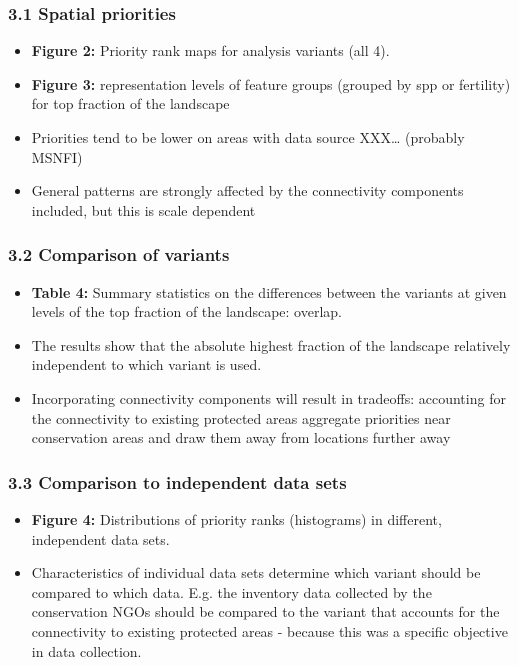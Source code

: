 \documentclass[]{article}
\begin{document}
\subsubsection{3.1 Spatial priorities}

\begin{itemize}
\item
  \textbf{Figure 2:} Priority rank maps for analysis variants (all 4).
\item
  \textbf{Figure 3:} representation levels of feature groups (grouped by
  spp or fertility) for top fraction of the landscape
\item
  Priorities tend to be lower on areas with data source XXX\ldots{}
  (probably MSNFI)
\item
  General patterns are strongly affected by the connectivity components
  included, but this is scale dependent
\end{itemize}

\subsubsection{3.2 Comparison of variants}

\begin{itemize}
\item
  \textbf{Table 4:} Summary statistics on the differences between the
  variants at given levels of the top fraction of the landscape:
  overlap.
\item
  The results show that the absolute highest fraction of the landscape
  relatively independent to which variant is used.
\item
  Incorporating connectivity components will result in tradeoffs:
  accounting for the connectivity to existing protected areas aggregate
  priorities near conservation areas and draw them away from locations
  further away
\end{itemize}

\subsubsection{3.3 Comparison to independent data sets}

\begin{itemize}
\item
  \textbf{Figure 4:} Distributions of priority ranks (histograms) in
  different, independent data sets.
\item
  Characteristics of individual data sets determine which variant should
  be compared to which data. E.g. the inventory data collected by the
  conservation NGOs should be compared to the variant that accounts for
  the connectivity to existing protected areas - because this was a
  specific objective in data collection.
\end{itemize}
\end{document}
